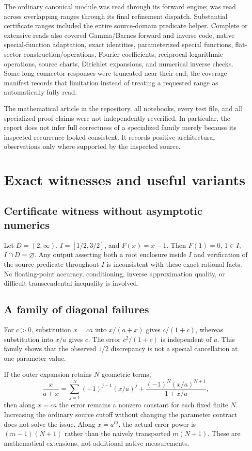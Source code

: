 \documentclass[11pt,letterpaper]{article}
\newcommand{\code}[1]{\texttt{\detokenize{#1}}}
\begin{document}
The ordinary canonical module was read through its forward engine; \code{SeriesOperations.wl} was read across overlapping ranges through its final refinement dispatch. Substantial certificate ranges included the entire source-domain predicate helper. Complete or extensive reads also covered Gamma/Barnes forward and inverse code, native special-function adaptation, exact identities, parameterized special functions, flat-sector construction/operations, Fourier coefficients, reciprocal-logarithmic operations, source charts, Dirichlet expansions, and numerical inverse checks. Some long connector responses were truncated near their end; the coverage manifest records that limitation instead of treating a requested range as automatically fully read.

The mathematical article in the repository, all notebooks, every test file, and all specialized proof claims were not independently reverified. In particular, the report does not infer full correctness of a specialized family merely because its inspected recurrence looked consistent. It records positive architectural observations only where supported by the inspected source.

\section{Exact witnesses and useful variants}
\subsection{Certificate witness without asymptotic numerics}
Let $D=(2,\infty)$, $I=[1/2,3/2]$, and $F(x)=x-1$. Then $F(1)=0$, $1\in I$, $I\cap D=\varnothing$. Any output asserting both a root enclosure inside $I$ and verification of the source predicate throughout $I$ is inconsistent with these exact rational facts. No floating-point accuracy, conditioning, inverse approximation quality, or difficult transcendental inequality is involved.

\subsection{A family of diagonal failures}
For $c>0$, substitution $x=ca$ into $x/(a+x)$ gives $c/(1+c)$, whereas substitution into $x/a$ gives $c$. The error $c^2/(1+c)$ is independent of $a$. This family shows that the observed $1/2$ discrepancy is not a special cancellation at one parameter value.

If the outer expansion retains $N$ geometric terms,
\begin{equation}
 \frac{x}{a+x}=\sum_{j=1}^{N}(-1)^{j-1}(x/a)^j
  +\frac{(-1)^N(x/a)^{N+1}}{1+x/a},
\end{equation}
then along $x=ca$ the error remains a nonzero constant for each fixed finite $N$. Increasing the ordinary source cutoff without changing the parameter contract does not solve the issue. Along $x=a^m$, the actual error power is $(m-1)(N+1)$ rather than the naively transported $m(N+1)$. These are mathematical extensions, not additional native measurements.
\end{document}
